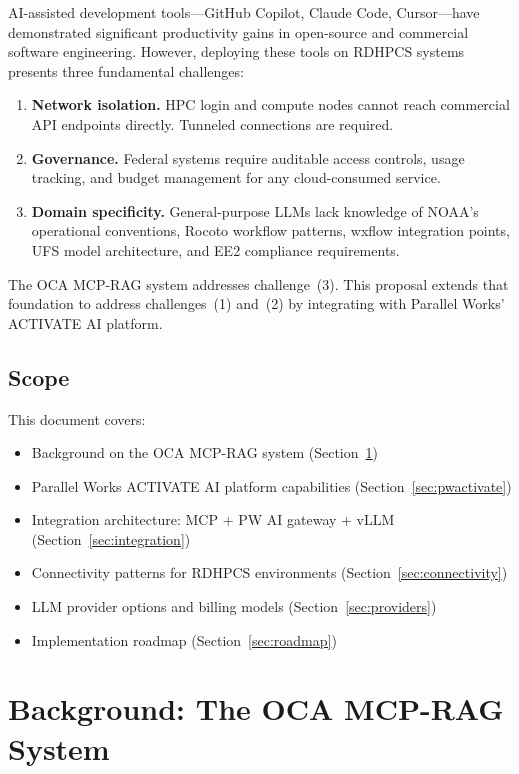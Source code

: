 \documentclass[11pt,letterpaper,twoside]{article}
\begin{document}
AI-assisted development tools---GitHub Copilot, Claude Code, Cursor---have
demonstrated significant productivity gains in open-source and commercial
software engineering. However, deploying these tools on RDHPCS systems
presents three fundamental challenges:

\begin{enumerate}
\item \textbf{Network isolation.} HPC login and compute nodes cannot reach
  commercial API endpoints directly. Tunneled connections are required.
\item \textbf{Governance.} Federal systems require auditable access controls,
  usage tracking, and budget management for any cloud-consumed service.
\item \textbf{Domain specificity.} General-purpose LLMs lack knowledge of
  NOAA's operational conventions, Rocoto workflow patterns, wxflow
  integration points, UFS model architecture, and EE2 compliance
  requirements.
\end{enumerate}

The OCA MCP-RAG system addresses challenge~(3). This proposal extends that
foundation to address challenges~(1) and~(2) by integrating with Parallel
Works' ACTIVATE AI platform.

\subsection{Scope}

This document covers:
\begin{itemize}
\item Background on the OCA MCP-RAG system (Section~\ref{sec:background})
\item Parallel Works ACTIVATE AI platform capabilities
  (Section~\ref{sec:pwactivate})
\item Integration architecture: MCP + PW AI gateway + vLLM
  (Section~\ref{sec:integration})
\item Connectivity patterns for RDHPCS environments
  (Section~\ref{sec:connectivity})
\item LLM provider options and billing models
  (Section~\ref{sec:providers})
\item Implementation roadmap (Section~\ref{sec:roadmap})
\end{itemize}

\section{Background: The OCA MCP-RAG System}
\label{sec:background}
\end{document}
